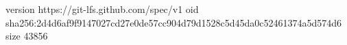 version https://git-lfs.github.com/spec/v1
oid sha256:2d4d6af9f9147027cd27e0de57cc904d79d1528c5d45da0c52461374a5d574d6
size 43856
